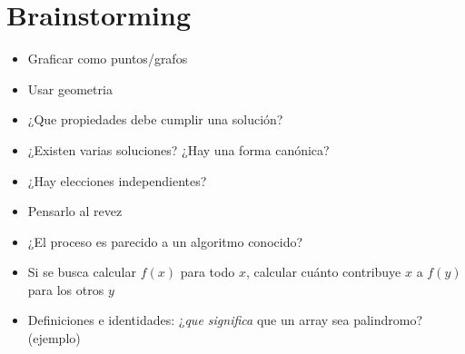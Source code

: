 

\def\title{Notebook}
\tableofcontents\newpage



















\section{Brainstorming}
    \begin{itemize}
        \item Graficar como puntos/grafos
        \item Usar geometria
        \item ¿Que propiedades debe cumplir una solución?
        \item ¿Existen varias soluciones? ¿Hay una forma canónica?
        \item ¿Hay elecciones independientes?
        \item Pensarlo al revez
        \item ¿El proceso es parecido a un algoritmo conocido?
        \item Si se busca calcular $f(x)$ para todo $x$, calcular cuánto contribuye $x$ a $f(y)$ para los otros $y$
        \item Definiciones e identidades: ¿\textit{que significa} que un array sea palindromo? (ejemplo)
    \end{itemize}

